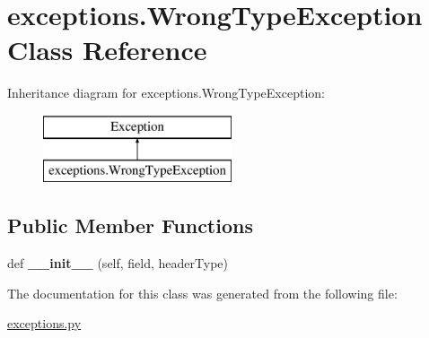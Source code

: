 \hypertarget{classexceptions_1_1WrongTypeException}{}\section{exceptions.\+Wrong\+Type\+Exception Class Reference}
\label{classexceptions_1_1WrongTypeException}
Inheritance diagram for exceptions.\+Wrong\+Type\+Exception\+:\begin{figure}[H]
\begin{center}
\leavevmode
\includegraphics[height=2.000000cm]{classexceptions_1_1WrongTypeException}
\end{center}
\end{figure}
\subsection*{Public Member Functions}
\begin{DoxyCompactItemize}
\item 
\mbox{\label{classexceptions_1_1WrongTypeException_a6682e9bfef1a83dc1126990fcc57dde2}} 
def {\bfseries \+\_\+\+\_\+init\+\_\+\+\_\+} (self, field, header\+Type)
\end{DoxyCompactItemize}


The documentation for this class was generated from the following file\+:\begin{DoxyCompactItemize}
\item 
\mbox{\hyperlink{exceptions_8py}{exceptions.\+py}}\end{DoxyCompactItemize}
